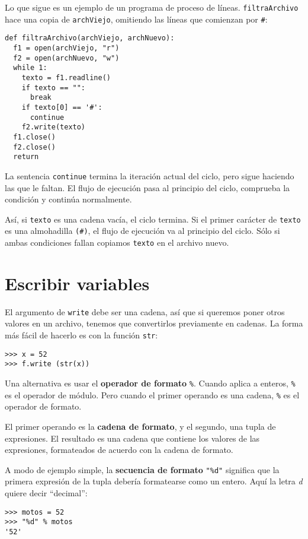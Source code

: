 Lo que sigue es un ejemplo de un programa de proceso de líneas. \texttt{filtraArchivo}
hace una copia de \texttt{archViejo}, omitiendo las líneas que comienzan
por \texttt{\#}:
\begin{lstlisting}
def filtraArchivo(archViejo, archNuevo):
  f1 = open(archViejo, "r")
  f2 = open(archNuevo, "w")
  while 1:
    texto = f1.readline()
    if texto == "":
      break
    if texto[0] == '#':
      continue
    f2.write(texto)
  f1.close()
  f2.close()
  return
\end{lstlisting}

La sentencia \texttt{continue} termina la iteración actual del ciclo,
pero sigue haciendo las que le faltan. El flujo de ejecución pasa
al principio del ciclo, comprueba la condición y continúa normalmente.

 

Así, si \texttt{texto} es una cadena vacía, el ciclo termina. Si el
primer carácter de \texttt{texto} es una almohadilla \texttt{(\#)},
el flujo de ejecución va al principio del ciclo. Sólo si ambas condiciones
fallan copiamos \texttt{texto} en el archivo nuevo.

\section{Escribir variables}

  

El argumento de \texttt{write} debe ser una cadena, así que si queremos
poner otros valores en un archivo, tenemos que convertirlos previamente
en cadenas. La forma más fácil de hacerlo es con la función \texttt{str}:
\begin{lstlisting}
>>> x = 52
>>> f.write (str(x))
\end{lstlisting}

Una alternativa es usar el \textbf{operador de formato} \texttt{\%}.
Cuando aplica a enteros, \texttt{\%} es el operador de módulo. Pero
cuando el primer operando es una cadena, \texttt{\%} es el operador
de formato.

El primer operando es la \textbf{cadena de formato}, y el segundo,
una tupla de expresiones. El resultado es una cadena que contiene
los valores de las expresiones, formateados de acuerdo con la cadena
de formato.

A modo de ejemplo simple, la \textbf{secuencia de formato} {\verb+"%d"+}
significa que la primera expresión de la tupla debería formatearse
como un entero. Aquí la letra {\em d} quiere decir ``decimal'':
\begin{lstlisting}
>>> motos = 52
>>> "%d" % motos
'52'
\end{lstlisting}

